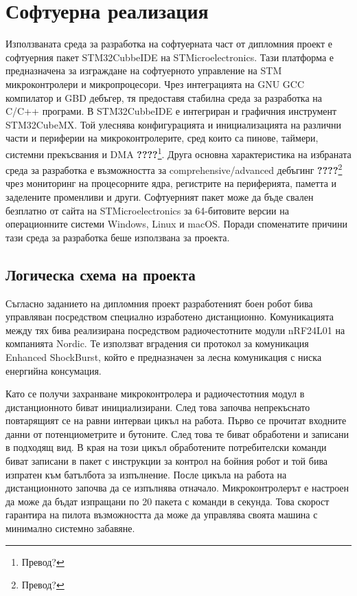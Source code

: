 \chapter{Софтуерна реализация}
\label{chap:software}
Използваната среда за разработка на софтуерната част от дипломния проект е софтуерния пакет STM32CubbeIDE на STMicroelectronics. Тази платформа е предназначена за изграждане на софтуерното управление на STM микроконтролери и микропроцесори. Чрез интеграцията на GNU GCC компилатор и GBD дебъгер, тя предоставя стабилна среда за разработка на C/C++ програми. В STM32CubbeIDE е интегриран и графичния инструмент STM32CubeMX. Той улеснява конфигурацията и инициализацията на различни части и периферии на микроконтролерите, сред които са пинове, таймери, системни прекъсвания и DMA \textbf{????}\footnote{Превод?}. Друга основна характеристика на избраната среда за разработка е възможността за comprehensive/advanced дебъгинг \textbf{????}\footnote{Превод?} чрез мониторинг на процесорните ядра, регистрите на периферията, паметта и заделените променливи и други. Софтуерният пакет може да бъде свален безплатно от сайта на STMicroelectronics за 64-битовите версии на операционните системи Windows, Linux и macOS. Поради споменатите причини тази среда за разработка беше използвана за проекта.



\section{Логическа схема на проекта}
\label{sec:logic-schemas}

Съгласно заданието на дипломния проект разработеният боен робот бива управляван посредством специално изработено дистанционно. Комуникацията между тях бива реализирана посредством радиочестотните модули nRF24L01 на компанията Nordic. Те използват вградения си протокол за комуникация Enhanced ShockBurst, който е предназначен за лесна комуникация с ниска енергийна консумация.

Като се получи захранване микроконтролера и радиочестотния модул в дистанционното биват инициализирани. След това започва непрекъснато повтарящият се на равни интерваи цикъл на работа. Първо се прочитат входните данни от потенциометрите и бутоните. След това те биват обработени и записани в подходящ вид. В края на този цикъл обработените потребителски команди биват записани в пакет с инструкции за контрол на бойния робот и той бива изпратен към батълбота за изпълнение. После цикъла на работа на дистанционното започва да се изпълнява отначало. Микроконтролерът е настроен да може да бъдат изпращани по 20 пакета с команди в секунда. Това скорост гарантира на пилота възможността да може да управлява своята машина с минимално системно забавяне.


